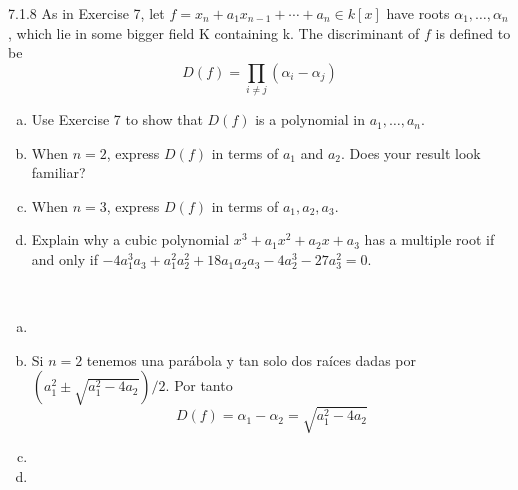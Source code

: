 \documentclass[twoside]{article}
\begin{document}
\newpage




\begin{ejercicio}{7.1.8}
As in Exercise 7, let $f = x_n +a_1x_{n−1} +\cdots + a_n ∈ k[x]$ have roots $α_1, \dotsc , α_n$, which lie
in some bigger field K containing k. The discriminant of $f$ is defined to be
$$
D( f) = \prod_{i\neq j}(\alpha_i - \alpha_j)
$$
\begin{enumerate}[a.]
\item Use Exercise 7 to show that $D( f )$ is a polynomial in $a_1, \dotsc, a_n$.
\item When $n = 2$, express $D( f )$ in terms of $a_1$ and $a_2$. Does your result look familiar?
\item  When $n = 3$, express $D( f )$ in terms of $a_1, a_2, a_3$.
\item Explain why a cubic polynomial $x^3 +a_1x^2 +a_2x+a_3$ has a multiple root if and only if $−4a^3_1a_3 + a^2_1a^2_2+ 18a_1a_2a_3 - 4a^3_2 - 27a^2_3= 0.$
\end{enumerate}
\end{ejercicio}

\begin{solucion}\
\begin{enumerate}[a.]
\item 
\item Si $n=2$ tenemos una parábola y tan solo dos raíces dadas por $(a_1^2\pm\sqrt{a_1^2-4a_2})/2$. Por tanto
$$
D(f)=\alpha_1 - \alpha_2 = \sqrt{a_1^2-4a_2}
$$
\item 
\item 
\end{enumerate}
\end{solucion}
\end{document}
